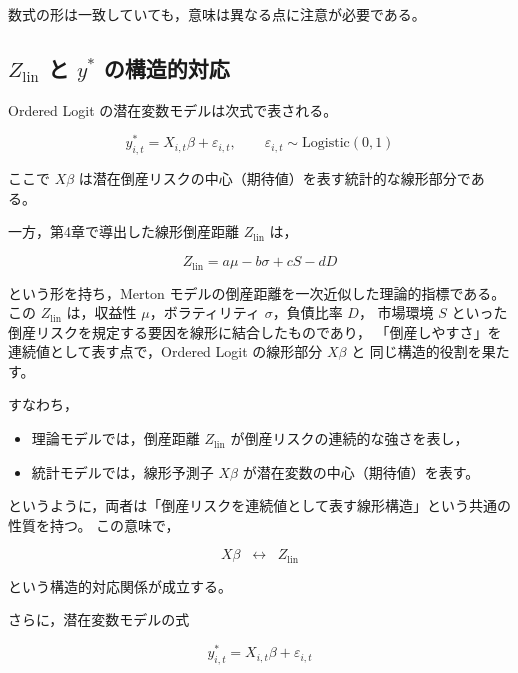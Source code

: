 数式の形は一致していても，意味は異なる点に注意が必要である。


\subsection{$Z_{\text{lin}}$ と $y^*$ の構造的対応}

Ordered Logit の潜在変数モデルは次式で表される。



\[
y^*_{i,t}
=
X_{i,t}\beta + \varepsilon_{i,t},
\qquad
\varepsilon_{i,t} \sim \text{Logistic}(0,1)
\]



ここで $X\beta$ は潜在倒産リスクの中心（期待値）を表す統計的な線形部分である。

一方，第4章で導出した線形倒産距離 $Z_{\text{lin}}$ は，



\[
Z_{\text{lin}} = a\mu - b\sigma + cS - dD
\]



という形を持ち，Merton モデルの倒産距離を一次近似した理論的指標である。
この $Z_{\text{lin}}$ は，収益性 $\mu$，ボラティリティ $\sigma$，負債比率 $D$，
市場環境 $S$ といった倒産リスクを規定する要因を線形に結合したものであり，
「倒産しやすさ」を連続値として表す点で，Ordered Logit の線形部分 $X\beta$ と
同じ構造的役割を果たす。

すなわち，

\begin{itemize}
    \item 理論モデルでは，倒産距離 $Z_{\text{lin}}$ が倒産リスクの連続的な強さを表し，
    \item 統計モデルでは，線形予測子 $X\beta$ が潜在変数の中心（期待値）を表す。
\end{itemize}

というように，両者は「倒産リスクを連続値として表す線形構造」という共通の性質を持つ。
この意味で，



\[
X\beta \;\;\longleftrightarrow\;\; Z_{\text{lin}}
\]



という構造的対応関係が成立する。

さらに，潜在変数モデルの式



\[
y^*_{i,t} = X_{i,t}\beta + \varepsilon_{i,t}
\]



